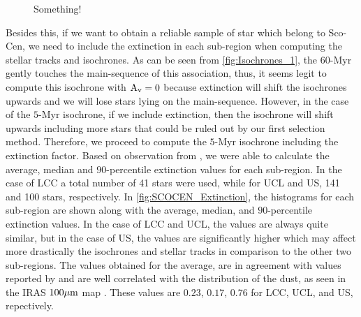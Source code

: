 \begin{figure}[!ht]
\centering
\caption{\scriptsize{Something!}}
\label{fig:Isochrones_2}
\end{figure}

Besides this, if we want to obtain a reliable sample of star which belong to Sco-Cen, we need to include the extinction in each sub-region when computing the stellar tracks and isochrones. As can be seen from \autoref{fig:Isochrones_1}, the $60$-Myr gently touches the main-sequence of this association, thus, it seems legit to compute this isochrone with $\textnormal{A}_\textnormal{v} = 0$ because extinction will shift the isochrones upwards and we will lose stars lying on the main-sequence. However, in the case of the $5$-Myr isochrone, if we include extinction, then the isochrone will shift upwards including more stars that could be ruled out by our first selection method. Therefore, we proceed to compute the $5$-Myr isochrone including the extinction factor. Based on observation from \citeyear{1989A&A...216...44D}, we were able to calculate the average, median and $90$-percentile extinction values for each sub-region. In the case of LCC a total number of 41 stars were used, while for UCL and US, 141 and 100 stars, respectively. In \autoref{fig:SCOCEN_Extinction}, the histograms for each sub-region are shown along with the average, median, and $90$-percentile extinction values. In the case of LCC and UCL, the values are always quite similar, but in the case of US, the values are significantly higher which may affect more drastically the isochrones and stellar tracks in comparison to the other two sub-regions. The values obtained for the average, are in agreement with values reported by \citeyear{2018MNRAS.tmp..210W} and are well correlated with the distribution of the dust, as seen in the IRAS $100 \mu \textnormal{m}$ map \citeyear{1989A&A...216...44D}. These values are $0.23$, $0.17$, $0.76$ for LCC, UCL, and US, repectively.\\     

